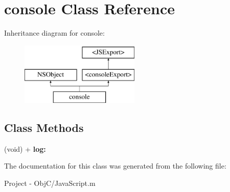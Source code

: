 \hypertarget{interfaceconsole}{}\section{console Class Reference}
\label{interfaceconsole}
Inheritance diagram for console\+:\begin{figure}[H]
\begin{center}
\leavevmode
\includegraphics[height=3.000000cm]{interfaceconsole}
\end{center}
\end{figure}
\subsection*{Class Methods}
\begin{DoxyCompactItemize}
\item 
\hypertarget{interfaceconsole_a65e8403977916d1b804e5d0e677ca55a}{}(void) + {\bfseries log\+:}\label{interfaceconsole_a65e8403977916d1b804e5d0e677ca55a}

\end{DoxyCompactItemize}


The documentation for this class was generated from the following file\+:\begin{DoxyCompactItemize}
\item 
Project -\/ Obj\+C/Java\+Script.\+m\end{DoxyCompactItemize}
